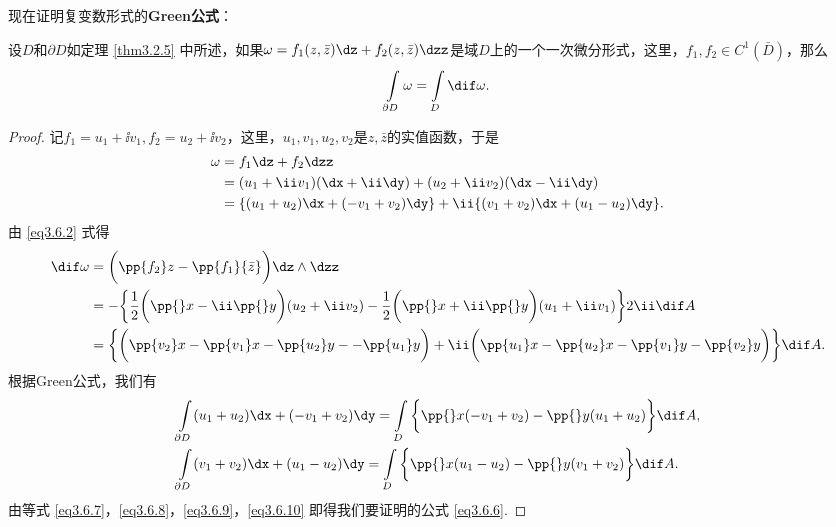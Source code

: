 现在证明复变数形式的\textbf{Green公式}：
\begin{theorem}\label{thm3.6.1}
设$D$和$\partial D$如定理 \ref{thm3.2.5} 中所述，如果$\omega=f_1(z,\bar z)\dz+f_2(z,\bar z)\dzz$是域$D$上的一个一次微分形式，这里，$f_1,f_2\in C^1(\bar D)$，那么
\begin{equation}\label{eq3.6.6}
\int\limits_{\partial D}\omega=\int\limits_D\dif \omega.
\end{equation}
\end{theorem}
\begin{proof}
记$f_1=u_1+\ii v_1,f_2=u_2+\ii v_2$，这里，$u_1,v_1,u_2,v_2$是$z,\bar z$的实值函数，于是
\begin{equation}\label{eq3.6.7}
\begin{aligned}
\omega&=f_1\dz+f_2\dzz\\
&=(u_1+\ii v_1)(\dx+\ii\dy)+(u_2+\ii v_2)(\dx-\ii\dy)\\
&=\{(u_1+u_2)\dx+(-v_1+v_2)\dy\}+\ii\{(v_1+v_2)\dx+(u_1-u_2)\dy\}.
\end{aligned}
\end{equation}
由 \eqref{eq3.6.2} 式得
\begin{equation}\label{eq3.6.8}
\begin{aligned}
\dif \omega&=\bigg(\pp{f_2}z-\pp{f_1}{\bar z}\bigg)\dz\wedge\dzz\\
&=-\bigg\{\frac12\bigg(\pp{}x-\ii\pp{}y\bigg)(u_2+\ii v_2)
 -\frac12\bigg(\pp{}x+\ii\pp{}y\bigg)(u_1+\ii v_1)\bigg\}2\ii\dif A\\
&=\bigg\{\bigg(\pp{v_2}x-\pp{v_1}x-\pp{u_2}y--\pp{u_1}y\bigg)
+\ii\bigg(\pp{u_1}x-\pp{u_2}x-\pp{v_1}y-\pp{v_2}y\bigg)\bigg\}\dif A.
\end{aligned}
\end{equation}
根据Green公式，我们有
\begin{align}
&\int\limits_{\partial D}(u_1+u_2)\dx+(-v_1+v_2)\dy
=\int\limits_D\bigg\{\pp{}x(-v_1+v_2)-\pp{}y(u_1+u_2)\bigg\}\dif A,\label{eq3.6.9}\\
&\int\limits_{\partial D}(v_1+v_2)\dx+(u_1-u_2)\dy
=\int\limits_D\bigg\{\pp{}x(u_1-u_2)-\pp{}y(v_1+v_2)\bigg\}\dif A.\label{eq3.6.10}
\end{align}
由等式 \eqref{eq3.6.7}，\eqref{eq3.6.8}，\eqref{eq3.6.9}，\eqref{eq3.6.10} 即得我们要证明的公式 \eqref{eq3.6.6}.
\end{proof}

